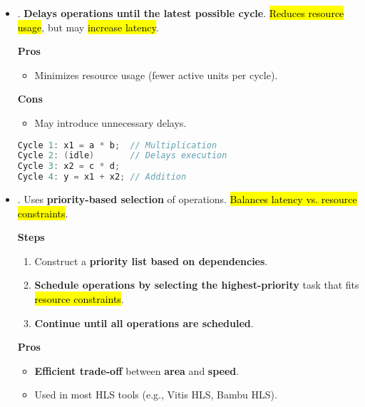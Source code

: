 \begin{itemize}
    \item {}. \textbf{Delays operations until the latest possible cycle}. \hl{Reduces resource usage}, but may \hl{increase latency}.
    \begin{flushleft}
        \textcolor{Green3}{ \textbf{Pros}}
    \end{flushleft}
    \begin{itemize}[label=\textcolor{Green3}{}]
        \item Minimizes resource usage (fewer active units per cycle).
    \end{itemize}
    \begin{flushleft}
        \textcolor{Red2}{ \textbf{Cons}}
    \end{flushleft}
    \begin{itemize}[label=\textcolor{Red2}{}]
        \item May introduce unnecessary delays.
    \end{itemize}
    \begin{examplebox}
        \begin{lstlisting}[language=c++]
Cycle 1: x1 = a * b;  // Multiplication
Cycle 2: (idle)       // Delays execution
Cycle 3: x2 = c * d;
Cycle 4: y = x1 + x2; // Addition\end{lstlisting}
    \end{examplebox}


    \item {}. Uses \textbf{priority-based selection} of operations. \hl{Balances latency vs. resource constraints}.
    \begin{flushleft}
        \textcolor{Green3}{ \textbf{Steps}}
    \end{flushleft}
    \begin{enumerate}
        \item Construct a \textbf{priority list based on dependencies}.
        \item \textbf{Schedule operations by selecting the highest-priority} task that fits \hl{resource constraints}.
        \item \textbf{Continue until all operations are scheduled}.
    \end{enumerate}
    \begin{flushleft}
        \textcolor{Green3}{ \textbf{Pros}}
    \end{flushleft}
    \begin{itemize}[label=\textcolor{Green3}{}]
        \item \textbf{Efficient trade-off} between \textbf{area} and \textbf{speed}.
        \item Used in most HLS tools (e.g., Vitis HLS, Bambu HLS).
    \end{itemize}



\end{itemize}
